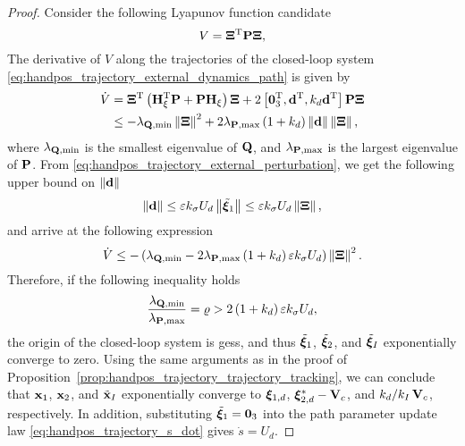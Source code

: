 \begin{proof}
    Consider the following Lyapunov function candidate
    \begin{equation}
        V = \bm{\Xi}^{\mathrm{T}} \mathbf{P} \bm{\Xi},
    \end{equation}
    The derivative of $V$ along the trajectories of the closed-loop system \eqref{eq:handpos_trajectory_external_dynamics_path} is given by
    \begin{equation}
    \begin{split}
        \dot{V} &= \bm{\Xi}^{\mathrm{T}}\left(\mathbf{H}_{\xi}^{\mathrm{T}} \mathbf{P} + \mathbf{P}\mathbf{H}_{\xi}\right)\bm{\Xi} + 2 \left[\mathbf{0}_3^{\mathrm{T}}, \mathbf{d}^{\mathrm{T}}, k_d \mathbf{d}^{\mathrm{T}}\right] \mathbf{P} \bm{\Xi} \\
            &\leq -\lambda_{\mathbf{Q},\min}\left\|\bm{\Xi}\right\|^2 + 2 \lambda_{\mathbf{P},\max}\left(1 + k_d\right)\left\|\mathbf{d}\right\|\left\|\bm{\Xi}\right\|,
    \end{split}
    \end{equation}
    where $\lambda_{\mathbf{Q},\min}$ is the smallest eigenvalue of $\mathbf{Q}$, and $\lambda_{\mathbf{P},\max}$ is the largest eigenvalue of $\mathbf{P}$.
    From \eqref{eq:handpos_trajectory_external_perturbation}, we get the following upper bound on $\left\|\mathbf{d}\right\|$
    \begin{equation}
        \left\|\mathbf{d}\right\| \leq \varepsilon k_{\sigma} U_d \left\|\tilde{\bm{\xi}}_1\right\| \leq \varepsilon k_{\sigma} U_d \left\|\bm{\Xi}\right\|,
    \end{equation}
    and arrive at the following expression
    \begin{equation}
        \dot{V} \leq - \left(\lambda_{\mathbf{Q},\min} - 2 \lambda_{\mathbf{P},\max}\left(1 + k_d\right)\varepsilon k_{\sigma} U_d\right) \left\|\bm{\Xi}\right\|^2.
    \end{equation}
    Therefore, if the following inequality holds
    \begin{equation}
        \frac{\lambda_{\mathbf{Q},\min}}{\lambda_{\mathbf{P},\max}} = \varrho > 2\left(1 + k_d\right)\varepsilon k_{\sigma} U_d,
    \end{equation}
    the origin of the closed-loop system is \glspl{ges}, and thus $\tilde{\bm{\xi}}_1$, $\tilde{\bm{\xi}}_2$, and $\tilde{\bm{\xi}}_I$ exponentially converge to zero.
    Using the same arguments as in the proof of Proposition~\ref{prop:handpos_trajectory_trajectory_tracking}, we can conclude that $\mathbf{x}_1$, $\mathbf{x}_2$, and $\tilde{\mathbf{x}}_I$ exponentially converge to $\bm{\xi}_{1, d}$, $\bm{\xi}_{2, d}^{*} - \mathbf{V}_c$, and $k_d/k_I\,\mathbf{V}_c$, respectively.
    In addition, substituting $\tilde{\bm{\xi}}_1 = \mathbf{0}_3$ into the path parameter update law \eqref{eq:handpos_trajectory_s_dot} gives $\dot{s} = U_d$.


\end{proof}
